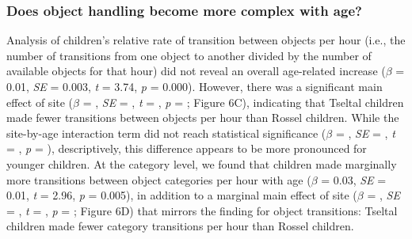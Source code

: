 \documentclass[10pt, letterpaper]{article}
\begin{document}
\hypertarget{does-object-handling-become-more-complex-with-age}{%
\subsubsection{Does object handling become more complex with
age?}\label{does-object-handling-become-more-complex-with-age}}

Analysis of children's relative rate of transition between objects per
hour (i.e., the number of transitions from one object to another divided
by the number of available objects for that hour) did not reveal an
overall age-related increase (\(\beta\) = 0.01, \emph{SE} = 0.003,
\emph{t} = 3.74, \emph{p} = 0.000). However, there was a significant
main effect of site (\(\beta\) = , \emph{SE} = , \emph{t} = , \emph{p} =
; Figure 6C), indicating that Tseltal children made fewer transitions
between objects per hour than Rossel children. While the site-by-age
interaction term did not reach statistical significance (\(\beta\) = ,
\emph{SE} = , \emph{t} = , \emph{p} = ), descriptively, this difference
appears to be more pronounced for younger children. At the category
level, we found that children made marginally more transitions between
object categories per hour with age (\(\beta\) = 0.03, \emph{SE} = 0.01,
\emph{t} = 2.96, \emph{p} = 0.005), in addition to a marginal main
effect of site (\(\beta\) = , \emph{SE} = , \emph{t} = , \emph{p} = ;
Figure 6D) that mirrors the finding for object transitions: Tseltal
children made fewer category transitions per hour than Rossel children.
\end{document}
